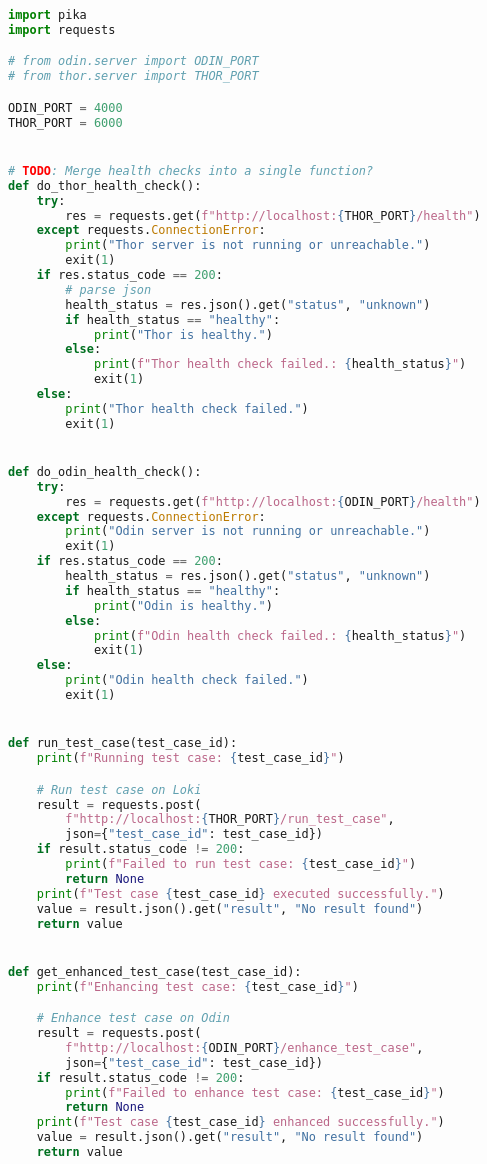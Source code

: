 \begin{lstlisting}[caption={loki/main.py, The implementation of the Loki script.}, label={lst:lokiMainImplementation}, language={Python}]
import pika
import requests

# from odin.server import ODIN_PORT
# from thor.server import THOR_PORT

ODIN_PORT = 4000
THOR_PORT = 6000


# TODO: Merge health checks into a single function?
def do_thor_health_check():
    try:
        res = requests.get(f"http://localhost:{THOR_PORT}/health")
    except requests.ConnectionError:
        print("Thor server is not running or unreachable.")
        exit(1)
    if res.status_code == 200:
        # parse json
        health_status = res.json().get("status", "unknown")
        if health_status == "healthy":
            print("Thor is healthy.")
        else:
            print(f"Thor health check failed.: {health_status}")
            exit(1)
    else:
        print("Thor health check failed.")
        exit(1)


def do_odin_health_check():
    try:
        res = requests.get(f"http://localhost:{ODIN_PORT}/health")
    except requests.ConnectionError:
        print("Odin server is not running or unreachable.")
        exit(1)
    if res.status_code == 200:
        health_status = res.json().get("status", "unknown")
        if health_status == "healthy":
            print("Odin is healthy.")
        else:
            print(f"Odin health check failed.: {health_status}")
            exit(1)
    else:
        print("Odin health check failed.")
        exit(1)


def run_test_case(test_case_id):
    print(f"Running test case: {test_case_id}")

    # Run test case on Loki
    result = requests.post(
        f"http://localhost:{THOR_PORT}/run_test_case",
        json={"test_case_id": test_case_id})
    if result.status_code != 200:
        print(f"Failed to run test case: {test_case_id}")
        return None
    print(f"Test case {test_case_id} executed successfully.")
    value = result.json().get("result", "No result found")
    return value


def get_enhanced_test_case(test_case_id):
    print(f"Enhancing test case: {test_case_id}")

    # Enhance test case on Odin
    result = requests.post(
        f"http://localhost:{ODIN_PORT}/enhance_test_case",
        json={"test_case_id": test_case_id})
    if result.status_code != 200:
        print(f"Failed to enhance test case: {test_case_id}")
        return None
    print(f"Test case {test_case_id} enhanced successfully.")
    value = result.json().get("result", "No result found")
    return value



\end{lstlisting}
